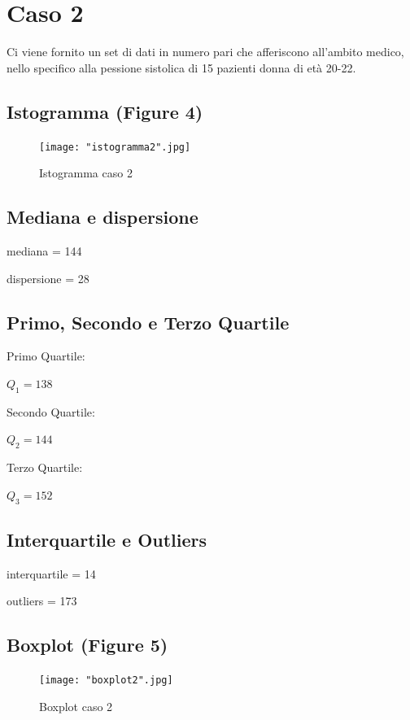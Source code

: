 \documentclass[a4paper]{article}
\begin{document}
\section{Caso 2}

Ci viene fornito un set di dati in numero pari che afferiscono all'ambito medico, nello specifico alla pessione sistolica di 15 pazienti donna di età 20-22. 
\\
\subsection{Istogramma (Figure 4)}
\begin{figure}[htp]
	\centering
	\texttt{[image: "istogramma2".jpg]}
	\caption{Istogramma caso 2}
	\label{}
\end{figure}

\subsection{Mediana e dispersione}
\begin{center}
	mediana = 144
\end{center}
\begin{center}
	dispersione = 28
\end{center}
\subsection{Primo, Secondo e Terzo Quartile}
Primo Quartile:
\begin{center}
	$Q_1= 138$
\end{center}
Secondo Quartile:
\begin{center}
	$Q_2= 144$
\end{center}
Terzo Quartile:
\begin{center}
	$Q_3= 152$
\end{center}


\subsection{Interquartile e Outliers}
\begin{center}
	interquartile = 14
\end{center}
\begin{center}
	outliers = 173
\end{center}

\subsection{Boxplot (Figure 5)}
\begin{figure}[htp]
	\centering
	\texttt{[image: "boxplot2".jpg]}
	\caption{Boxplot caso 2}
	\label{}
\end{figure}
\end{document}
